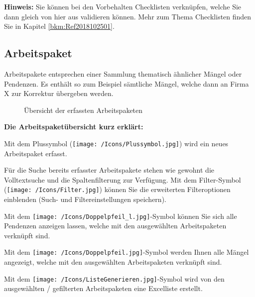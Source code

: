 \vspace{\baselineskip}

\textbf{Hinweis:} Sie können bei den Vorbehalten Checklisten verknüpfen, welche Sie dann gleich von hier aus validieren können. Mehr zum Thema Checklisten finden Sie in Kapitel \ref{bkm:Ref2018102501}.

\pagebreak
\subsection{Arbeitspaket}

Arbeitspakete entsprechen einer Sammlung thematisch ähnlicher Mängel oder Pendenzen. Es enthält so zum Beispiel sämtliche Mängel, welche dann an Firma X zur Korrektur übergeben werden.

\begin{figure}[H]
\caption{Übersicht der erfassten Arbeitspaketen}
\end{figure}

\textbf{Die Arbeitspaketübersicht kurz erklärt:}

\vspace{\baselineskip}

\begin{compactitem}
	\item Mit dem Plussymbol (\texttt{[image: /Icons/Plussymbol.jpg]}) wird ein neues Arbeitspaket erfasst. 
	\item Für die Suche bereits erfasster Arbeitspakete stehen wie gewohnt die Volltextsuche und die Spaltenfilterung zur Verfügung. Mit dem Filter-Symbol (\texttt{[image: /Icons/Filter.jpg]}) können Sie die erweiterten Filteroptionen einblenden (Such- und Filtereinstellungen speichern).
	\item Mit dem \texttt{[image: /Icons/Doppelpfeil\_l.jpg]}-Symbol können Sie sich alle Pendenzen anzeigen lassen, welche mit den ausgewählten Arbeitspaketen verknüpft sind.
	\item Mit dem \texttt{[image: /Icons/Doppelpfeil.jpg]}-Symbol werden Ihnen alle Mängel angezeigt, welche mit den ausgewählten Arbeitspaketen verknüpft sind.
	\item Mit dem \texttt{[image: /Icons/ListeGenerieren.jpg]}-Symbol wird von den ausgewählten / gefilterten Arbeitspaketen eine Excelliste erstellt.
\end{compactitem}

